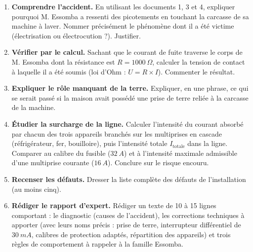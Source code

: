 \documentclass[11pt]{article}
\newcounter{popsec}
\newcounter{popsub}
\newcommand{\courssub}[1]{%
  \stepcounter{popsub}%
  \par\vspace{9pt}\noindent{\popxbold\fontsize{11.5}{13}\selectfont\color{popink}{\color{poporange}\thepopsec.\thepopsub}\hspace{6pt}#1}\par\nopagebreak\vspace{4pt}
}
\begin{document}
\begin{enumerate}
\item \textbf{Comprendre l'accident.} En utilisant les documents 1, 3 et 4, expliquer pourquoi M. Essomba a ressenti des picotements en touchant la carcasse de sa machine à laver. Nommer précisément le phénomène dont il a été victime (électrisation ou électrocution ?). Justifier.
\item \textbf{Vérifier par le calcul.} Sachant que le courant de fuite traverse le corps de M. Essomba dont la résistance est $R = \SI{1000}{\Omega}$, calculer la tension de contact à laquelle il a été soumis (loi d'Ohm : $U = R \times I$). Commenter le résultat.
\item \textbf{Expliquer le rôle manquant de la terre.} Expliquer, en une phrase, ce qui se serait passé si la maison avait possédé une prise de terre reliée à la carcasse de la machine.
\item \textbf{Étudier la surcharge de la ligne.} Calculer l'intensité du courant absorbé par chacun des trois appareils branchés sur les multiprises en cascade (réfrigérateur, fer, bouilloire), puis l'intensité totale $I_{\text{totale}}$ dans la ligne. Comparer au calibre du fusible ($\SI{32}{A}$) et à l'intensité maximale admissible d'une multiprise courante ($\SI{16}{A}$). Conclure sur le risque encouru.
\item \textbf{Recenser les défauts.} Dresser la liste complète des défauts de l'installation (au moins cinq).
\item \textbf{Rédiger le rapport d'expert.} Rédiger un texte de 10 à 15 lignes comportant : le diagnostic (causes de l'accident), les corrections techniques à apporter (avec leurs noms précis : prise de terre, interrupteur différentiel de $\SI{30}{mA}$, calibres de protection adaptés, répartition des appareils) et trois règles de comportement à rappeler à la famille Essomba.
\end{enumerate}

\courssub{Ressources à mobiliser}
\end{document}
